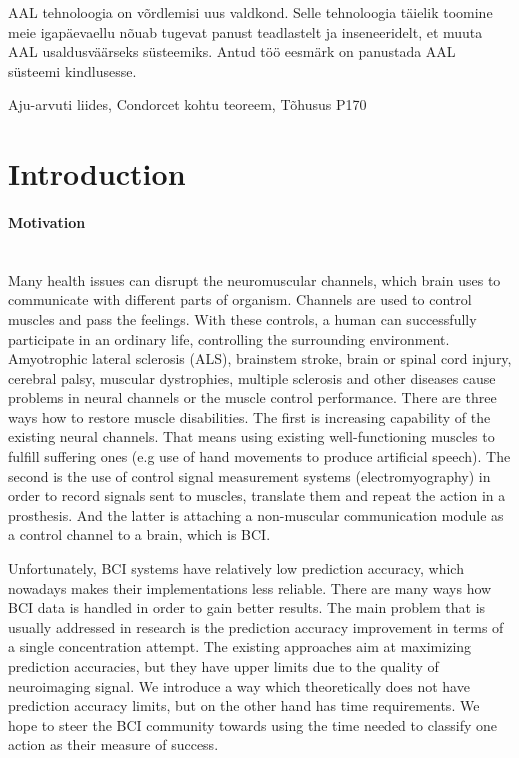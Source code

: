 \documentclass[12pt]{article}
\theoremstyle{definition}
\newcommand{\TODO}{\todo[inline]}
\begin{document}
AAL tehnoloogia on võrdlemisi uus valdkond. Selle tehnoloogia täielik toomine meie igapäevaellu nõuab tugevat panust teadlastelt ja inseneeridelt, et muuta AAL usaldusväärseks süsteemiks. Antud töö eesmärk on panustada AAL süsteemi kindlusesse.

\vspace*{3ex}
{}
Aju-arvuti liides, Condorcet kohtu teoreem, Tõhusus
{}
P170
\vspace*{3ex}




\newpage
\tableofcontents


\newpage
\section*{Introduction}
\paragraph{Motivation}~\\

Many health issues can disrupt the neuromuscular channels, which brain uses to communicate with different parts of organism. Channels are used to control muscles and pass the feelings. With these controls, a human can successfully participate in an ordinary life, controlling the surrounding environment. Amyotrophic lateral sclerosis (ALS), brainstem stroke, brain or spinal cord injury, cerebral palsy, muscular dystrophies, multiple sclerosis and other diseases cause problems in neural channels or the muscle control performance. There are three ways how to restore muscle disabilities. The first is increasing capability of the existing neural channels. That means using existing well-functioning muscles to fulfill suffering ones (e.g use of hand movements to produce artificial speech). The second is the use of control signal measurement systems (electromyography) in order to record signals sent to muscles, translate them and repeat the action in a prosthesis. And the latter is attaching a non-muscular communication module as a control channel to a brain, which is BCI. \cite{bci_jonathan}

Unfortunately, BCI systems have relatively low prediction accuracy, which nowadays makes their implementations less reliable. There are many ways how BCI data is handled in order to gain better results. The main problem that is usually addressed in research is the prediction accuracy improvement in terms of a single concentration attempt. The existing approaches aim at maximizing prediction accuracies, but they have upper limits due to the quality of neuroimaging signal. We introduce a way which theoretically does not have prediction accuracy limits, but on the other hand has time requirements. We hope to steer the BCI community towards using the time needed to classify one action as their measure of success.
\end{document}
